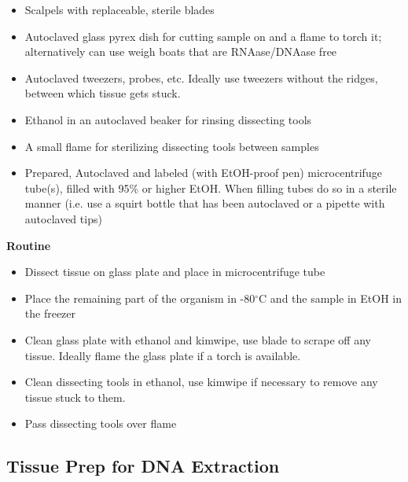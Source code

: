 \documentclass[11pt, oneside]{article}
\begin{document}
		\begin{itemize}
		\itemsep0em
			\item Scalpels with replaceable, sterile blades
			\item Autoclaved glass pyrex dish for cutting sample on and a flame to torch it; alternatively can use weigh boats that are RNAase/DNAase free
			\item Autoclaved tweezers, probes, etc.  Ideally use tweezers without the ridges, between which tissue gets stuck.
			\item Ethanol in an autoclaved beaker for rinsing dissecting tools
			\item A small flame for sterilizing dissecting tools between samples
			\item Prepared, Autoclaved and labeled (with EtOH-proof pen) microcentrifuge tube(s), filled with 95\% or higher EtOH.  When filling tubes 			do so in a sterile manner (i.e. use a squirt bottle that has been autoclaved or a pipette with autoclaved tips)
		\end{itemize}
	
	{\bf Routine}
		
		\begin{itemize}
		\itemsep0em
			\item Dissect tissue on glass plate and place in microcentrifuge tube
			\item Place the remaining part of the organism in -80$^{\circ}$C and the sample in EtOH in the freezer
			\item Clean glass plate with ethanol and kimwipe, use blade to scrape off any tissue. Ideally flame the glass plate if a torch is available.
			\item Clean dissecting tools in ethanol, use kimwipe if necessary to remove any tissue stuck to them.
			\item Pass dissecting tools over flame
		\end{itemize}

	\newpage
	
	\subsection{Tissue Prep for DNA Extraction}
	
\end{document}
